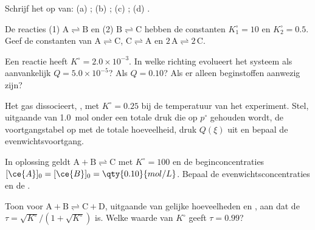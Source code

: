 \begin{exercise}[$\star$]\label{exo:b1:extent-q-and-k:4}
Schrijf het  op van: (a) ;
(b) ; (c) ; (d) .
\end{exercise}

\begin{exercise}[$\star\star$]\label{exo:b1:extent-q-and-k:5}
De reacties (1) $\mathrm{A \rightleftharpoons B}$ en (2) $\mathrm{B \rightleftharpoons C}$ hebben de constanten
$K_1^\circ = 10$ en $K_2^\circ = 0.5$. Geef de constanten van
$\mathrm{A \rightleftharpoons C}$,
$\mathrm{C \rightleftharpoons A}$ en $\mathrm{2\,A \rightleftharpoons 2\,C}$.
\end{exercise}

\begin{exercise}[$\star\star$]\label{exo:b1:extent-q-and-k:6}
Een reactie heeft $K^\circ = 2.0 \times 10^{-3}$. In welke richting
evolueert het systeem als aanvankelijk $Q = 5.0 \times 10^{-5}$? Als
$Q = 0.10$? Als er alleen beginstoffen aanwezig zijn?
\end{exercise}

\begin{exercise}[$\star\star$]\label{exo:b1:extent-q-and-k:7}
Het gas  dissocieert, , met $K^\circ = 0.25$
bij de temperatuur van het experiment. Stel, uitgaande van
\qty{1.0}{mol}  onder een totale druk die op $p^\circ$ gehouden
wordt, de voortgangstabel op met de totale hoeveelheid, druk $Q(\xi)$ uit
en bepaal de evenwichtsvoortgang.
\end{exercise}

\begin{exercise}[$\star\star$]\label{exo:b1:extent-q-and-k:8}
In oplossing geldt $\mathrm{A + B \rightleftharpoons C}$ met $K^\circ = 100$ en de
beginconcentraties $[\ce{A}]_0 = [\ce{B}]_0 = \qty{0.10}{mol/L}$. Bepaal
de evenwichtsconcentraties en de .
\end{exercise}

\begin{exercise}[$\star\star$]\label{exo:b1:extent-q-and-k:9}
Toon voor $\mathrm{A + B \rightleftharpoons C + D}$, uitgaande van gelijke hoeveelheden 
en , aan dat de  $\tau = \sqrt{K^\circ}/(1 + \sqrt{K^\circ})$
is. Welke waarde van $K^\circ$ geeft $\tau = 0.99$?
\end{exercise}

